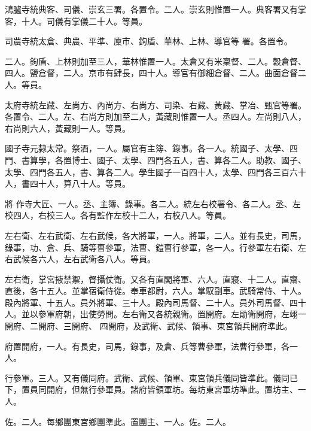 \begin{pinyinscope}
 鴻臚寺統典客、司儀、崇玄三署。各置令。二人。崇玄則惟置一人。典客署又有掌客，十人。司儀有掌儀二十人。等員。



 司農寺統太倉、典農、平準、廩市、鉤盾、華林、上林、導官等
 署。各置令。



 二人。鉤盾、上林則加至三人，華林惟置一人。太倉又有米稟督、二人。穀倉督、四人。鹽倉督，二人。京市有肆長，四十人。導官有御細倉督、二人。曲面倉督二人。等員。



 太府寺統左藏、左尚方、內尚方、右尚方、司染、右藏、黃藏、掌冶、甄官等署。各置令、二人。左、右尚方則加至二人，黃藏則惟置一人。丞四人。左尚則八人，右尚則六人，黃藏則一人。等員。



 國子寺元隸太常。祭酒，一人。屬官有主簿、錄事。各一人。統國子、太學、四門、書算學，各置博士、國子、太學、四門各五人，書、算各二人。助教、國子、太學、四門各五人，書、算各二人。學生國子一百四十人，太學、四門各三百六十人，書四十人，算八十人。等員。



 將
 作寺大匠、一人。丞、主簿、錄事。各二人。統左右校署令、各二人。丞、左校四人，右校三人。各有監作左校十二人，右校八人。等員。



 左右衛、左右武衛、左右武候，各大將軍，一人。將軍，二人。並有長史，司馬，錄事，功、倉、兵、騎等曹參軍，法曹、鎧曹行參軍，各一人。行參軍左右衛、左右武候各六人，左右武衛各八人。等員。



 左右衛，掌宮掖禁禦，督攝仗衛。又各有直閣將軍、六人。直寢、十二人。直齋、直後，各十五人。並掌宿衛侍從。奉車都尉，六人。掌馭副車。武騎常侍、十人。殿內將軍、十五人。員外將軍、三十人。殿內司馬督、二十人。員外司馬督、四十人。並以參軍府朝，出使勞問。左右衛又各統親衛。置開府。左勛衛開府，左翊一開府、二開府、三開府、
 四開府，及武衛、武候、領事、東宮領兵開府準此。



 府置開府，一人。有長史，司馬，錄事，及倉、兵等曹參軍，法曹行參軍，各一人。



 行參軍。三人。又有儀同府。武衛、武候、領軍、東宮領兵儀同皆準此。儀同已下，置員同開府，但無行參軍員。諸府皆領軍坊。每坊東宮軍坊準此。置坊主、一人。



 佐。二人。每鄉團東宮鄉團準此。置團主、一人。佐。二人。




\end{pinyinscope}
